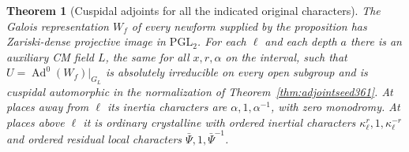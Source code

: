 \documentclass[a4paper,11pt]{article}
\newtheorem{theorem}[proposition]{Theorem}
\theoremstyle{definition}
\theoremstyle{remark}
\numberwithin{equation}{section}
\begin{document}
\begin{theorem}[Cuspidal adjoints for all the indicated original characters]\leavevmode
\label{thm:twoprimeadjoints436}
The Galois representation \(W_f\) of every newform supplied
by the proposition has Zariski-dense projective image in
\(\mathrm{PGL}_2\). For each \(\ell\) and each depth \(a\)
there is an auxiliary CM field \(L\), the same for all
\(x,r,\alpha\) on the interval, such that
\(U=\operatorname{Ad}^0(W_f)|_{G_L}\) is absolutely irreducible
on every open subgroup and is cuspidal automorphic in the
normalization of Theorem~\ref{thm:adjointseed361}. At places
away from \(\ell\) its inertia characters are
\(\alpha,1,\alpha^{-1}\), with zero monodromy. At places
above \(\ell\) it is ordinary crystalline with ordered
inertial characters \(\kappa_\ell^r,1,\kappa_\ell^{-r}\) and
ordered residual local characters \(\bar\Psi,1,\bar\Psi^{-1}\).
\end{theorem}
\end{document}
